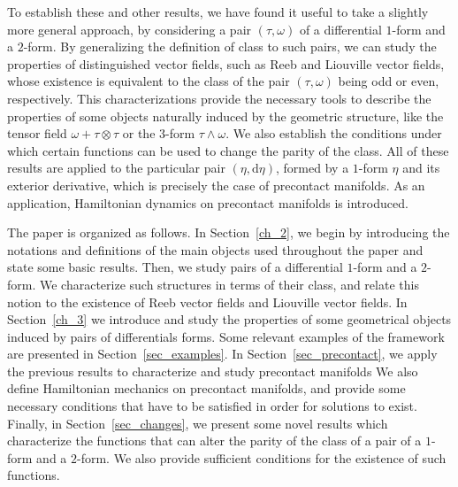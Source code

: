 \documentclass[11pt,twoside]{article}
\theoremstyle{plain}
\theoremstyle{definition}
\renewcommand{\d}{\mathrm{d}}
\def\d{\mathrm{d}}
\def\d{\mathrm{d}}
\begin{document}
To establish these and other results, we have found it useful to take a slightly more general approach, 
by considering a pair $(\tau,\omega)$ of a differential $1$-form and a $2$-form.
By generalizing the definition of class to such pairs, we can study the properties of distinguished vector fields, such as Reeb and Liouville vector fields, whose existence is equivalent to the class of the pair $(\tau,\omega)$ being odd or even, respectively. 
This characterizations provide the necessary tools to describe the properties of some objects naturally induced by the geometric structure, 
like the tensor field $\omega + \tau \otimes \tau$ or the $3$-form $\tau \wedge \omega$.
We also establish the conditions under which certain functions can be used to change the parity of the class.
All of these results are applied to the particular pair $(\eta,\d\eta)$, formed by a $1$-form $\eta$ and its exterior derivative, which is precisely the case of precontact manifolds. 
As an application, Hamiltonian dynamics on precontact manifolds is introduced.


The paper is organized as follows.
In Section~\ref{ch_2}, we begin by introducing the notations and definitions of the main objects used throughout the paper and state some basic results. 
Then, we study pairs of a differential $1$-form and a $2$-form.
We characterize such structures in terms of their class, and relate this notion to the existence of Reeb vector fields and Liouville vector fields.
In Section~\ref{ch_3} we introduce and study the properties of some geometrical objects induced by pairs of differentials forms.
Some relevant examples of the framework are presented in Section~\ref{sec_examples}. 
In Section~\ref{sec_precontact}, we apply the previous results to characterize and study precontact manifolds
We also define Hamiltonian mechanics on precontact manifolds, and provide some necessary conditions that have to be satisfied in order for solutions to exist.
Finally, in Section~\ref{sec_changes}, we present some novel results which characterize the functions that can alter the parity of the class of a pair of a $1$-form and a $2$-form. 
We also provide sufficient conditions for the existence of such functions.
\end{document}
